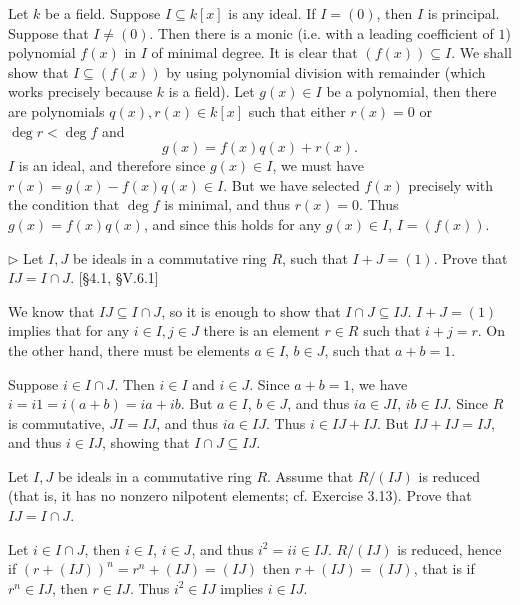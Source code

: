 \begin{solution}
	Let $k$ be a field. Suppose $I \subseteq k[x]$ is any ideal. If $I = (0)$, then $I$ is principal. Suppose that $I \neq (0)$. Then there is a monic (i.e. with a leading coefficient of $1$) polynomial $f(x)$ in $I$ of minimal degree. It is clear that $(f(x)) \subseteq I$. We shall show that $I \subseteq (f(x))$ by using polynomial division with remainder (which works precisely because $k$ is a field). Let $g(x) \in I$ be a polynomial, then there are polynomials $q(x), r(x) \in k[x]$ such that either $r(x) = 0$ or $\deg r < \deg f$ and
	\[
		g(x) = f(x)q(x) + r(x) \text{.}
	\]
	$I$ is an ideal, and therefore since $g(x) \in I$, we must have $r(x) = g(x) - f(x)q(x) \in I$. But we have selected $f(x)$ precisely with the condition that $\deg f$ is minimal, and thus $r(x) = 0$. Thus $g(x) = f(x)q(x)$, and since this holds for any $g(x) \in I$, $I = (f(x))$.
\end{solution}

\begin{problem}
	$\triangleright$ Let $I, J$ be ideals in a commutative ring $R$, such that $I + J = (1)$. Prove that $IJ = I \cap J$. [\S 4.1, \S V.6.1]
\end{problem}

\begin{solution}
	We know that $IJ \subseteq I \cap J$, so it is enough to show that $I \cap J \subseteq IJ$. $I + J = (1)$ implies that for any $i \in I, j \in J$ there is an element $r \in R$ such that $i + j = r$. On the other hand, there must be elements $a \in I$, $b \in J$, such that $a + b = 1$.
	
	Suppose $i \in I \cap J$. Then $i \in I$ and $i \in J$. Since $a + b = 1$, we have $i = i 1 = i (a + b) = ia + ib$. But $a \in I$, $b \in J$, and thus $ia \in JI$, $ib \in IJ$. Since $R$ is commutative, $JI = IJ$, and thus $ia \in IJ$. Thus $i \in IJ + IJ$. But $IJ + IJ = IJ$, and thus $i \in IJ$, showing that $I \cap J \subseteq IJ$.
\end{solution}

\begin{problem}
	Let $I, J$ be ideals in a commutative ring $R$. Assume that $R/(IJ)$ is reduced (that is, it has no nonzero nilpotent elements; cf. Exercise 3.13). Prove that $IJ = I \cap J$.
\end{problem}

\begin{solution}
	Let $i \in I \cap J$, then $i \in I$, $i \in J$, and thus  $i^2 = ii \in IJ$. $R/(IJ)$ is reduced, hence if $(r + (IJ))^n = r^n + (IJ) = (IJ)$ then $r + (IJ) = (IJ)$, that is if $r^n \in IJ$, then $r \in IJ$. Thus $i^2 \in IJ$ implies $i \in IJ$.
\end{solution}

